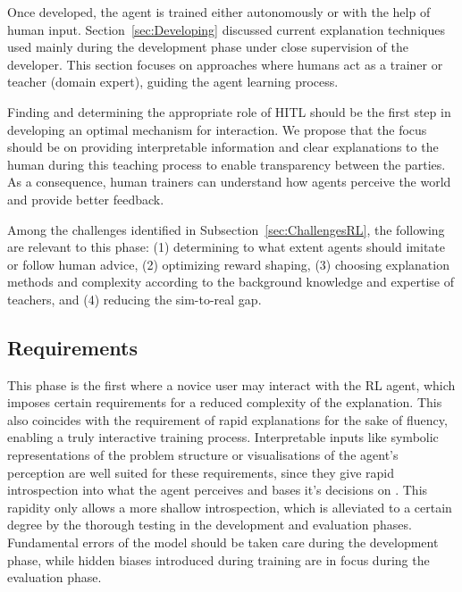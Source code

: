 \documentclass[twoside,11pt]{article}
\begin{document}

Once developed, the agent is trained either autonomously or with the help of human input. Section~\ref{sec:Developing} discussed current explanation techniques used mainly during the development phase under close supervision of the developer. This section focuses on approaches where humans act as a trainer or teacher (domain expert), guiding the agent learning process.

Finding and determining the appropriate role of HITL should be the first step in developing an optimal mechanism for interaction. We propose that the focus should be on providing interpretable information and clear explanations to the human during this teaching process to enable transparency between the parties. As a consequence, human trainers can understand how agents perceive the world and provide better feedback.

Among the challenges identified in Subsection~\ref{sec:ChallengesRL}, the following are relevant to this phase: (1) determining to what extent agents should imitate or follow human advice, (2) optimizing reward shaping,  (3) choosing explanation methods and complexity according to the background knowledge and expertise of teachers, and (4) reducing the sim-to-real gap. 

\subsection{Requirements}
This phase is the first where a novice user may interact with the RL agent, which imposes certain requirements for a reduced complexity of the explanation. This also coincides with the requirement of rapid explanations for the sake of fluency, enabling a truly interactive training process. Interpretable inputs like symbolic representations of the problem structure or visualisations of the agent's perception are well suited for these requirements, since they give rapid introspection into what the agent perceives and bases it's decisions on \citep{GlanoisEtAl:2021:SurveyInterpretableRL}. This rapidity only allows a more shallow introspection, which is alleviated to a certain degree by the thorough testing in the development and evaluation phases. Fundamental errors of the model should be taken care during the development phase, while hidden biases introduced during training are in focus during the evaluation phase.
\end{document}
